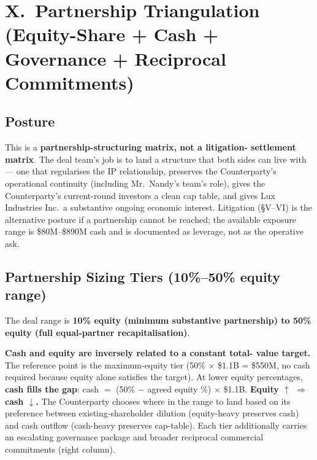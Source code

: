 \documentclass[11pt,letterpaper]{article}
\begin{document}
\section*{X.\ Partnership Triangulation (Equity-Share + Cash + Governance + Reciprocal Commitments)}

\subsection*{Posture}

This is a \textbf{partnership-structuring matrix, not a litigation-
settlement matrix}. The deal team's job is to land a structure that
both sides can live with --- one that regularises the IP relationship,
preserves the Counterparty's operational continuity (including Mr.\
Nandy's team's role), gives the Counterparty's current-round investors
a clean cap table, and gives Lux Industries Inc.\ a substantive
ongoing economic interest. Litigation (\S V--VI) is the alternative
posture if a partnership cannot be reached; the available exposure
range is \$80M--\$890M cash and is documented as leverage, not as
the operative ask.

\subsection*{Partnership Sizing Tiers (10\%--50\% equity range)}

The deal range is \textbf{10\% equity (minimum substantive
partnership) to 50\% equity (full equal-partner recapitalisation)}.

\textbf{Cash and equity are inversely related to a constant total-
value target.} The reference point is the maximum-equity tier (50\%
$\times$ \$1.1B = \$550M, no cash required because equity alone
satisfies the target). At lower equity percentages, \textbf{cash
fills the gap}: cash $=$ (50\% $-$ agreed equity \%) $\times$ \$1.1B.
\textbf{Equity $\uparrow$ $\Rightarrow$ cash $\downarrow$.} The
Counterparty chooses where in the range to land based on its
preference between existing-shareholder dilution (equity-heavy
preserves cash) and cash outflow (cash-heavy preserves cap-table).
Each tier additionally carries an escalating governance package and
broader reciprocal commercial commitments (right column).
\end{document}

